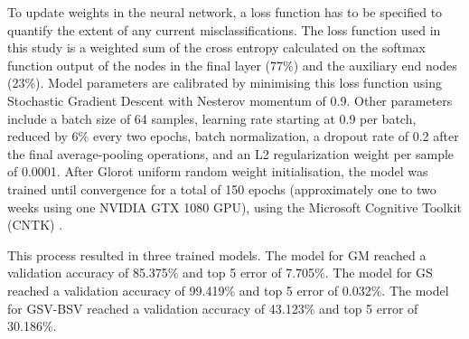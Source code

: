 \documentclass[sageh,times]{sagej}
\begin{document}
To update weights in the neural network, a loss function has to be specified to quantify the extent of any current misclassifications. The loss function used in this study is a weighted sum of the cross entropy calculated on the softmax function output of the nodes in the final layer (77\%) and the auxiliary end nodes (23\%). Model parameters are calibrated by minimising this loss function using Stochastic Gradient Descent with Nesterov momentum of 0.9. Other parameters include a batch size of 64 samples, learning rate starting at 0.9 per batch, reduced by 6\% every two epochs, batch normalization, a dropout rate of 0.2 after the final average-pooling operations, and an L2 regularization weight per sample of 0.0001. After Glorot uniform random weight initialisation, the model was trained until convergence for a total of 150 epochs (approximately one to two weeks using one NVIDIA GTX 1080 GPU), using the Microsoft Cognitive Toolkit (CNTK) \citep{Yu2015}. 

This process resulted in three trained models. The model for GM reached a validation accuracy of 85.375\% and top 5 error of 7.705\%. The model for GS reached a validation accuracy of 99.419\% and top 5 error of 0.032\%. The model for GSV-BSV reached a validation accuracy of 43.123\% and top 5 error of 30.186\%.

%
%
%
%
%
\end{document}
